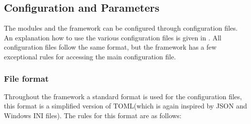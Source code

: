 \subsection{Configuration and Parameters}
\label{sec:config_parameters}
The modules and the framework can be configured through configuration files. An explanation how to use the various configuration files is given in \needref. All configuration files follow the same format, but the framework has a few exceptional rules for accessing the main configuration file.

\subsubsection{File format}
\label{sec:config_file_format}
Throughout the framework a standard format is used for the configuration files, this format is a simplified version of TOML\needref (which is again inspired by JSON and Windows INI files). The rules for this format are as follows:
